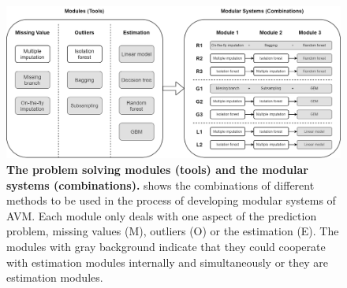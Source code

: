 \begin{figure}[ht]
\begin{center}
\includegraphics[scale=0.25]{./images/approach_tools}
\caption{{\bf The problem solving modules (tools) and the modular systems (combinations).} shows the combinations of different methods to be used in the process of developing modular systems of AVM. Each module only deals with one aspect of the prediction problem, missing values (M), outliers (O) or the estimation (E). The modules with gray background indicate that they could cooperate with estimation modules internally and simultaneously or they are estimation modules.\setlength{\baselineskip}{1.25em}}
\label{fig_approach_tools}
\end{center}
\end{figure}
